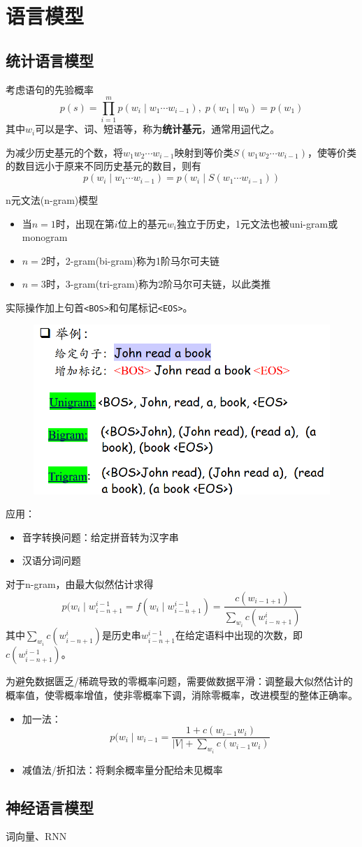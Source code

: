 
\section{语言模型}
\subsection{统计语言模型}
考虑语句的先验概率
\[p(s)=\prod_{i=1}^{m}p(w_i\mid w_1\cdots w_{i-1}),\;p(w_1\mid w_0)=p(w_1)\]
其中$w_i$可以是字、词、短语等，称为\textbf{统计基元}，通常用\underline{词}代之。

为减少历史基元的个数，将$w_1w_2\cdots w_{i-1}$映射到等价类$S(w_1w_2\cdots w_{i-1})$，使等价类的数目远小于原来不同历史基元的数目，则有
\[p(w_i\mid w_1\cdots w_{i-1})=p(w_i\mid S(w_1\cdots w_{i-1}))\]

n元文法(n-gram)模型
\begin{itemize}
	\item 当$n=1$时，出现在第$i$位上的基元$w_i$独立于历史，1元文法也被uni-gram或monogram
	\item $n=2$时，2-gram(bi-gram)称为1阶马尔可夫链
	\item $n=3$时，3-gram(tri-gram)称为2阶马尔可夫链，以此类推
\end{itemize}
实际操作加上句首\verb'<BOS>'和句尾标记\verb'<EOS>'。
\begin{figure}[H]
\centering
\includegraphics[width=0.8\linewidth]{fig/n-gram.png}
\end{figure}

应用：
\begin{itemize}
	\item 音字转换问题：给定拼音转为汉字串
	\item 汉语分词问题
\end{itemize}

对于n-gram，由最大似然估计求得
\[p(w_i\mid w_{i-n+1}^{i-1}=f(w_i\mid w_{i-n+1}^{i-1})=\frac{c(w_{i-1+1})}{\sum_{w_i}c(w_{i-n+1}^i)}\]
其中$\sum_{w_i}c(w_{i-n+1}^i)$是历史串$w_{i-n+1}^{i-1}$在给定语料中出现的次数，即$c(w_{i-n+1}^{i-1})$。

为避免数据匮乏/稀疏导致的零概率问题，需要做数据平滑：调整最大似然估计的概率值，使零概率增值，使非零概率下调，消除零概率，改进模型的整体正确率。
\begin{itemize}
	\item 加一法：
	\[p(w_i\mid w_{i-1}=\frac{1+c(w_{i-1}w_i)}{|V|+\sum_{w_i}c(w_{i-1}w_i)}\]
	\item 减值法/折扣法：将剩余概率量分配给未见概率
\end{itemize}

\subsection{神经语言模型}
词向量、RNN